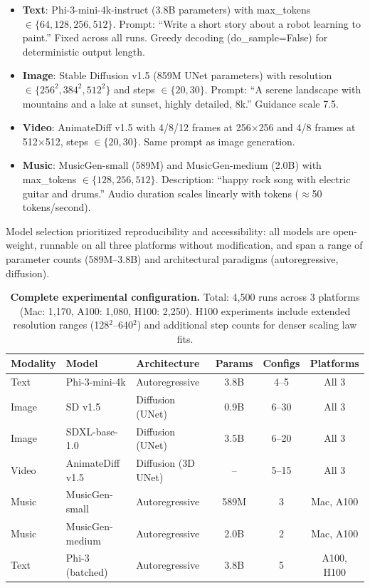\documentclass[11pt]{article}
\begin{document}
\begin{itemize}[leftmargin=*]
\item \textbf{Text}: Phi-3-mini-4k-instruct\cite{abdin2024phi3} (3.8B parameters) with max\_tokens $\in \{64, 128, 256, 512\}$. Prompt: ``Write a short story about a robot learning to paint.'' Fixed across all runs. Greedy decoding (do\_sample=False) for deterministic output length.
\item \textbf{Image}: Stable Diffusion v1.5\cite{rombach2022high} (859M UNet parameters) with resolution $\in \{256^2, 384^2, 512^2\}$ and steps $\in \{20, 30\}$. Prompt: ``A serene landscape with mountains and a lake at sunset, highly detailed, 8k.'' Guidance scale 7.5.
\item \textbf{Video}: AnimateDiff v1.5\cite{guo2024animatediff} with 4/8/12 frames at 256$\times$256 and 4/8 frames at 512$\times$512, steps $\in \{20, 30\}$. Same prompt as image generation.
\item \textbf{Music}: MusicGen-small\cite{copet2024musicgen} (589M) and MusicGen-medium (2.0B) with max\_tokens $\in \{128, 256, 512\}$. Description: ``happy rock song with electric guitar and drums.'' Audio duration scales linearly with tokens ($\approx$50 tokens/second).
\end{itemize}

Model selection prioritized reproducibility and accessibility: all models are open-weight, runnable on all three platforms without modification, and span a range of parameter counts (589M--3.8B) and architectural paradigms (autoregressive, diffusion).

\begin{table}[t]
\centering
\caption{\textbf{Complete experimental configuration.} Total: 4,500 runs across 3 platforms (Mac: 1,170, A100: 1,080, H100: 2,250). H100 experiments include extended resolution ranges (128$^2$--640$^2$) and additional step counts for denser scaling law fits.}
\label{tab:models_detail}
\small
\begin{tabular}{@{}lllccc@{}}
\toprule
\textbf{Modality} & \textbf{Model} & \textbf{Architecture} & \textbf{Params} & \textbf{Configs} & \textbf{Platforms} \\
\midrule
Text & Phi-3-mini-4k & Autoregressive & 3.8B & 4--5 & All 3 \\
Image & SD v1.5 & Diffusion (UNet) & 0.9B & 6--30 & All 3 \\
Image & SDXL-base-1.0 & Diffusion (UNet) & 3.5B & 6--20 & All 3 \\
Video & AnimateDiff v1.5 & Diffusion (3D UNet) & -- & 5--15 & All 3 \\
Music & MusicGen-small & Autoregressive & 589M & 3 & Mac, A100 \\
Music & MusicGen-medium & Autoregressive & 2.0B & 2 & Mac, A100 \\
Text & Phi-3 (batched) & Autoregressive & 3.8B & 5 & A100, H100 \\
\bottomrule
\end{tabular}
\end{table}
\end{document}
